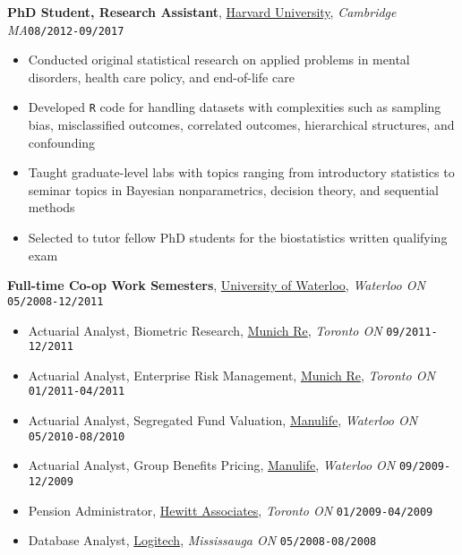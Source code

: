 \documentclass[10pt,english]{article}
\begin{document}
\vspace{2mm}

\textbf{PhD Student, Research Assistant}, \textcolor{blue}{\href{https://gsas.harvard.edu/programs-of-study/all/biostatistics}{Harvard University}}, \textit{Cambridge MA}\hfill \texttt{08/2012-09/2017}
\begin{itemize}
\item Conducted original statistical research on applied problems in mental disorders, health care policy, and end-of-life care
\item Developed \texttt{R} code for handling datasets with complexities such as sampling bias, misclassified outcomes, correlated outcomes, hierarchical structures, and confounding
\item Taught graduate-level labs with topics ranging from introductory statistics to seminar topics in Bayesian nonparametrics, decision theory, and sequential methods
\item Selected to tutor fellow PhD students for the biostatistics written qualifying exam
\end{itemize}

\vspace{2mm}

\textbf{Full-time Co-op Work Semesters}, \textcolor{blue}{\href{https://uwaterloo.ca/math/}{University of Waterloo}}, \textit{Waterloo ON} \hfill \texttt{05/2008-12/2011}
\begin{itemize}
\item Actuarial Analyst, Biometric Research, \textcolor{blue}{\href{https://www.munichre.com/ca}{Munich Re}}, \textit{Toronto ON} \hfill \texttt{09/2011-12/2011}
\item Actuarial Analyst, Enterprise Risk Management, \textcolor{blue}{\href{https://www.munichre.com/ca}{Munich Re}}, \textit{Toronto ON} \hfill \texttt{01/2011-04/2011}
\item Actuarial Analyst, Segregated Fund Valuation, \textcolor{blue}{\href{https://www.manulife.ca}{Manulife}}, \textit{Waterloo ON} \hfill \texttt{05/2010-08/2010}
\item Actuarial Analyst, Group Benefits Pricing, \textcolor{blue}{\href{https://www.manulife.ca}{Manulife}}, \textit{Waterloo ON} \hfill \texttt{09/2009-12/2009}
\item Pension Administrator, \textcolor{blue}{\href{http://www.aonhewitt.com}{Hewitt Associates}}, \textit{Toronto ON} \hfill \texttt{01/2009-04/2009}
\item Database Analyst, \textcolor{blue}{\href{https://www.logitech.com/en-ca}{Logitech}}, \textit{Mississauga ON} \hfill \texttt{05/2008-08/2008}
\end{itemize}
\end{document}
